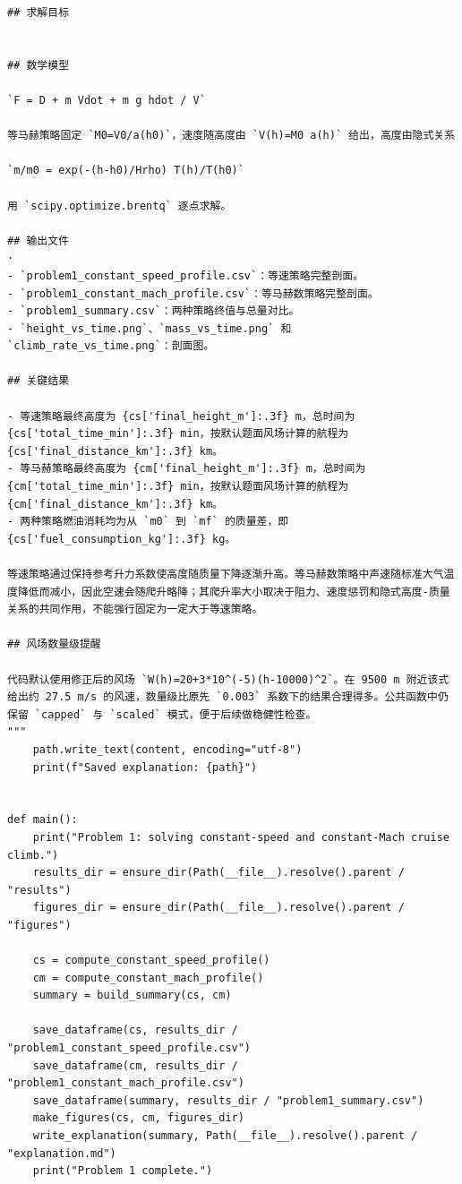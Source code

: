 \documentclass[UTF8]{ctexart}
\begin{document}
\begin{center}
\begin{lstlisting}
## 求解目标


## 数学模型

`F = D + m Vdot + m g hdot / V`

等马赫策略固定 `M0=V0/a(h0)`，速度随高度由 `V(h)=M0 a(h)` 给出，高度由隐式关系

`m/m0 = exp(-(h-h0)/Hrho) T(h)/T(h0)`

用 `scipy.optimize.brentq` 逐点求解。

## 输出文件
·
- `problem1_constant_speed_profile.csv`：等速策略完整剖面。
- `problem1_constant_mach_profile.csv`：等马赫数策略完整剖面。
- `problem1_summary.csv`：两种策略终值与总量对比。
- `height_vs_time.png`、`mass_vs_time.png` 和 `climb_rate_vs_time.png`：剖面图。

## 关键结果

- 等速策略最终高度为 {cs['final_height_m']:.3f} m，总时间为 {cs['total_time_min']:.3f} min，按默认题面风场计算的航程为 {cs['final_distance_km']:.3f} km。
- 等马赫策略最终高度为 {cm['final_height_m']:.3f} m，总时间为 {cm['total_time_min']:.3f} min，按默认题面风场计算的航程为 {cm['final_distance_km']:.3f} km。
- 两种策略燃油消耗均为从 `m0` 到 `mf` 的质量差，即 {cs['fuel_consumption_kg']:.3f} kg。

等速策略通过保持参考升力系数使高度随质量下降逐渐升高。等马赫数策略中声速随标准大气温度降低而减小，因此空速会随爬升略降；其爬升率大小取决于阻力、速度惩罚和隐式高度-质量关系的共同作用，不能强行固定为一定大于等速策略。

## 风场数量级提醒

代码默认使用修正后的风场 `W(h)=20+3*10^(-5)(h-10000)^2`。在 9500 m 附近该式给出约 27.5 m/s 的风速，数量级比原先 `0.003` 系数下的结果合理得多。公共函数中仍保留 `capped` 与 `scaled` 模式，便于后续做稳健性检查。
"""
    path.write_text(content, encoding="utf-8")
    print(f"Saved explanation: {path}")


def main():
    print("Problem 1: solving constant-speed and constant-Mach cruise climb.")
    results_dir = ensure_dir(Path(__file__).resolve().parent / "results")
    figures_dir = ensure_dir(Path(__file__).resolve().parent / "figures")

    cs = compute_constant_speed_profile()
    cm = compute_constant_mach_profile()
    summary = build_summary(cs, cm)

    save_dataframe(cs, results_dir / "problem1_constant_speed_profile.csv")
    save_dataframe(cm, results_dir / "problem1_constant_mach_profile.csv")
    save_dataframe(summary, results_dir / "problem1_summary.csv")
    make_figures(cs, cm, figures_dir)
    write_explanation(summary, Path(__file__).resolve().parent / "explanation.md")
    print("Problem 1 complete.")



\end{lstlisting}
\end{center}
\end{document}
